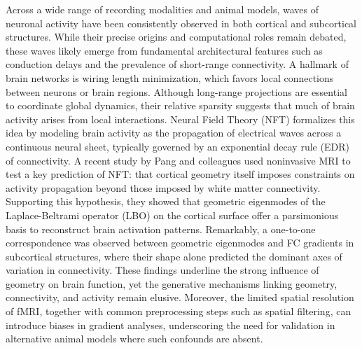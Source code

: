 \documentclass{article}
\begin{document}
Across a wide range of recording modalities and animal models, waves of neuronal activity have been consistently observed in both cortical and subcortical structures\cite{raut2021global, ye2023brain, matsui2016transient, xu2023interacting}. While their precise origins and computational roles remain debated, these waves likely emerge from fundamental architectural features such as conduction delays and the prevalence of short-range connectivity\cite{muller2018cortical}. A hallmark of brain networks is wiring length minimization, which favors local connections between neurons or brain regions\cite{bullmore2012economy}. Although long-range projections are essential to coordinate global dynamics\cite{o2013causal, betzel2018specificity, vohryzek2025human}, their relative sparsity suggests that much of brain activity arises from local interactions. Neural Field Theory (NFT) formalizes this idea by modeling brain activity as the propagation of electrical waves across a continuous neural sheet\cite{robinson1997propagation, robinson2016eigenmodes, gabay2018dynamics}, typically governed by an exponential decay rule (EDR) of connectivity\cite{ercsey2013predictive}. A recent study by Pang and colleagues\cite{pang2023geometric} used noninvasive MRI to test a key prediction of NFT: that cortical geometry itself imposes constraints on activity propagation beyond those imposed by white matter connectivity. Supporting this hypothesis, they showed that geometric eigenmodes of the Laplace-Beltrami operator (LBO) on the cortical surface offer a parsimonious basis to reconstruct brain activation patterns\cite{pang2023geometric}. Remarkably, a one-to-one correspondence was observed between geometric eigenmodes and FC gradients in subcortical structures, where their shape alone predicted the dominant axes of variation in connectivity\cite{pang2023geometric}. These findings underline the strong influence of geometry on brain function, yet the generative mechanisms linking geometry, connectivity, and activity remain elusive. Moreover, the limited spatial resolution of fMRI, together with common preprocessing steps such as spatial filtering, can introduce biases in gradient analyses\cite{watson2023connectopic}, underscoring the need for validation in alternative animal models where such confounds are absent.
\end{document}
